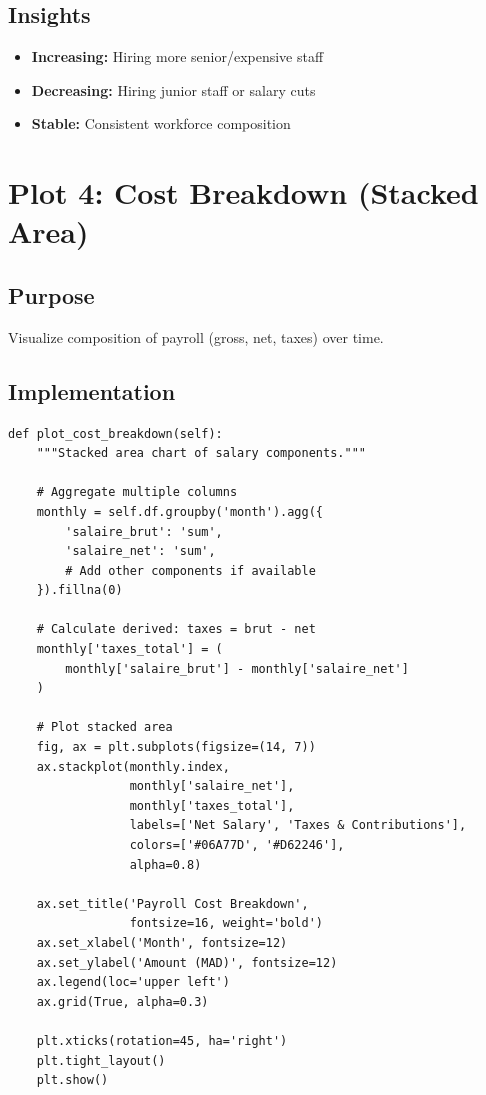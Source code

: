 \subsection{Insights}

\begin{itemize}
    \item \textbf{Increasing:} Hiring more senior/expensive staff
    \item \textbf{Decreasing:} Hiring junior staff or salary cuts
    \item \textbf{Stable:} Consistent workforce composition
\end{itemize}

\section{Plot 4: Cost Breakdown (Stacked Area)}

\subsection{Purpose}
Visualize composition of payroll (gross, net, taxes) over time.

\subsection{Implementation}

\begin{lstlisting}[style=pythonstyle]
def plot_cost_breakdown(self):
    """Stacked area chart of salary components."""
    
    # Aggregate multiple columns
    monthly = self.df.groupby('month').agg({
        'salaire_brut': 'sum',
        'salaire_net': 'sum',
        # Add other components if available
    }).fillna(0)
    
    # Calculate derived: taxes = brut - net
    monthly['taxes_total'] = (
        monthly['salaire_brut'] - monthly['salaire_net']
    )
    
    # Plot stacked area
    fig, ax = plt.subplots(figsize=(14, 7))
    ax.stackplot(monthly.index,
                 monthly['salaire_net'],
                 monthly['taxes_total'],
                 labels=['Net Salary', 'Taxes & Contributions'],
                 colors=['#06A77D', '#D62246'],
                 alpha=0.8)
    
    ax.set_title('Payroll Cost Breakdown',
                 fontsize=16, weight='bold')
    ax.set_xlabel('Month', fontsize=12)
    ax.set_ylabel('Amount (MAD)', fontsize=12)
    ax.legend(loc='upper left')
    ax.grid(True, alpha=0.3)
    
    plt.xticks(rotation=45, ha='right')
    plt.tight_layout()
    plt.show()
\end{lstlisting}

